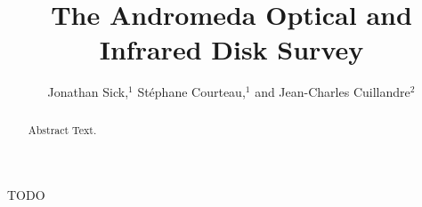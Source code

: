 \documentclass[11pt,twoside]{article}
\begin{document}
\title{The Andromeda Optical and Infrared Disk Survey}
\author{Jonathan Sick,$^1$ St\'{e}phane Courteau,$^1$ and Jean-Charles Cuillandre$^2$}

\begin{abstract}
Abstract Text.
\end{abstract}


\acknowledgements TODO

% 
\end{document}
